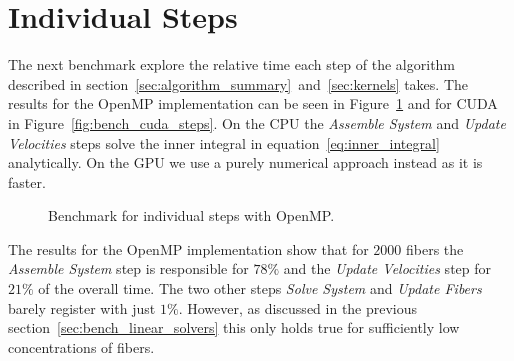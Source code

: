\documentclass[a4paper,11pt]{kth-mag}
\begin{document}
\section{Individual Steps}

The next benchmark explore the relative time each step of the algorithm described in section~\ref{sec:algorithm_summary}~and~\ref{sec:kernels} takes. The results for the OpenMP implementation can be seen in Figure~\ref{fig:bench_openmp_steps} and for CUDA in Figure~\ref{fig:bench_cuda_steps}. On the CPU the \emph{Assemble System} and \emph{Update Velocities} steps solve the inner integral in equation~\eqref{eq:inner_integral} analytically. On the GPU we use a purely numerical approach instead as it is faster.

\begin{figure}[!htbp]
  \centering
  \caption{Benchmark for individual steps with OpenMP.}
  \label{fig:bench_openmp_steps}
\end{figure}

The results for the OpenMP implementation show that for $2000$ fibers the \emph{Assemble System} step is responsible for $78\%$ and the \emph{Update Velocities} step for $21\%$ of the overall time. The two other steps \emph{Solve System} and \emph{Update Fibers} barely register with just $1\%$. However, as discussed in the previous section~\ref{sec:bench_linear_solvers} this only holds true for sufficiently low concentrations of fibers.
\end{document}
